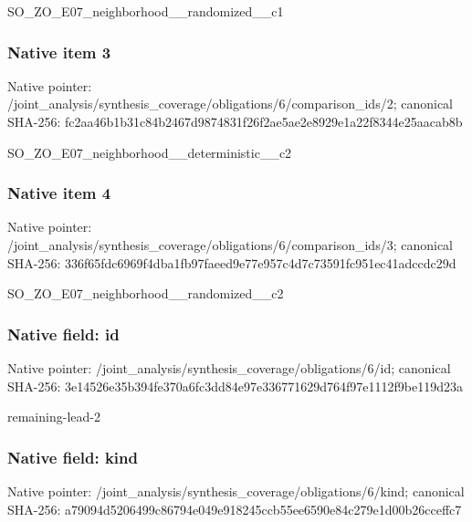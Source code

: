 \documentclass[10pt,a4paper]{article}
\begin{document}
\begingroup\raggedright\sloppy SO\_\allowbreak{}ZO\_\allowbreak{}E07\_\allowbreak{}neighborhood\_\allowbreak{}\_\allowbreak{}randomized\_\allowbreak{}\_\allowbreak{}c1\par\endgroup

\subsubsection{Native item 3}
Native pointer: /joint\_\allowbreak{}analysis/synthesis\_\allowbreak{}coverage/obligations/6/comparison\_\allowbreak{}ids/2; canonical SHA-256: fc2aa46b1b31c84b2467d9874831f26f2ae5ae2e8929e1a22f8344e25aacab8b

\begingroup\raggedright\sloppy SO\_\allowbreak{}ZO\_\allowbreak{}E07\_\allowbreak{}neighborhood\_\allowbreak{}\_\allowbreak{}deterministic\_\allowbreak{}\_\allowbreak{}c2\par\endgroup

\subsubsection{Native item 4}
Native pointer: /joint\_\allowbreak{}analysis/synthesis\_\allowbreak{}coverage/obligations/6/comparison\_\allowbreak{}ids/3; canonical SHA-256: 336f65fdc6969f4dba1fb97faeed9e77e957c4d7c73591fc951ec41adccdc29d

\begingroup\raggedright\sloppy SO\_\allowbreak{}ZO\_\allowbreak{}E07\_\allowbreak{}neighborhood\_\allowbreak{}\_\allowbreak{}randomized\_\allowbreak{}\_\allowbreak{}c2\par\endgroup

\subsubsection{Native field: id}
Native pointer: /joint\_\allowbreak{}analysis/synthesis\_\allowbreak{}coverage/obligations/6/id; canonical SHA-256: 3e14526e35b394fe370a6fc3dd84e97e336771629d764f97e1112f9be119d23a

\begingroup\raggedright\sloppy remaining-lead-2\par\endgroup

\subsubsection{Native field: kind}
Native pointer: /joint\_\allowbreak{}analysis/synthesis\_\allowbreak{}coverage/obligations/6/kind; canonical SHA-256: a79094d5206499c86794e049e918245ccb55ee6590e84c279e1d00b26cceffc7
\end{document}
